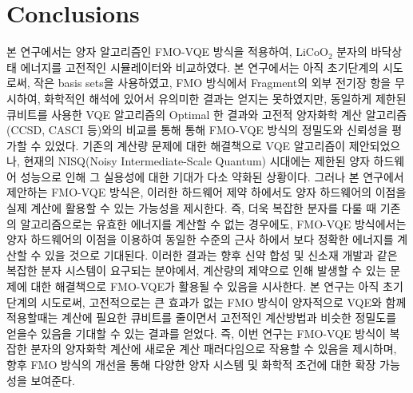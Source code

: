 \documentclass[pdflatex,sn-mathphys-num]{sn-jnl}%
\theoremstyle{thmstyleone}%
\theoremstyle{thmstyletwo}%
\theoremstyle{thmstylethree}%
\begin{document}
\section{Conclusions}
본 연구에서는 양자 알고리즘인 FMO-VQE 방식을 적용하여, \(\mathrm{LiCoO_2}\)  분자의 바닥상태 에너지를 고전적인 시뮬레이터와 비교하였다. 본 연구에서는 아직 초기단계의 시도로써, 작은 basis sets을 사용하였고, FMO 방식에서 Fragment의 외부 전기장 항을 무시하여, 화학적인 해석에 있어서 유의미한 결과는 얻지는 못하였지만, 
동일하게 제한된 큐비트를 사용한 VQE 알고리즘의 Optimal 한 결과와 고전적 양자화학 계산 알고리즘 (CCSD, CASCI 등)와의 비교를 통해 통해 FMO-VQE 방식의 정밀도와 신뢰성을 평가할 수 있었다.
기존의 계산량 문제에 대한 해결책으로 VQE 알고리즘이 제안되었으나, 현재의 NISQ(Noisy Intermediate-Scale Quantum) 시대에는 제한된 양자 하드웨어 성능으로 인해 그 실용성에 대한 기대가 다소 약화된 상황이다. 그러나 본 연구에서 제안하는 FMO-VQE 방식은, 이러한 하드웨어 제약 하에서도 양자 하드웨어의 이점을 실제 계산에 활용할 수 있는 가능성을 제시한다.
즉, 더욱 복잡한 분자를 다룰 때 기존의 알고리즘으로는 유효한 에너지를 계산할 수 없는 경우에도, FMO-VQE 방식에서는 양자 하드웨어의 이점을 이용하여 동일한 수준의 근사 하에서 보다 정확한 에너지를 계산할 수 있을 것으로 기대된다. 이러한 결과는 향후 신약 합성 및 신소재 개발과 같은 복잡한 분자 시스템이 요구되는 분야에서, 계산량의 제약으로 인해 발생할 수 있는 문제에 대한 해결책으로 FMO-VQE가 활용될 수 있음을 시사한다. 
본 연구는 아직 초기 단계의 시도로써, 고전적으로는 큰 효과가 없는 FMO 방식이 양자적으로 VQE와 함께 적용할때는 계산에 필요한 큐비트를 줄이면서 고전적인 계산방법과 비슷한 정밀도를 얻을수 있음을 기대할 수 있는 결과를 얻었다. 즉, 이번 연구는 FMO-VQE 방식이 복잡한 분자의 양자화학 계산에 새로운 계산 패러다임으로 작용할 수 있음을 제시하며, 향후 FMO 방식의 개선을 통해 다양한 양자 시스템 및 화학적 조건에 대한 확장 가능성을 보여준다.


\end{document}
